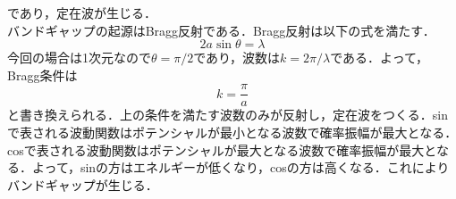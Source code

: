 \documentclass{standalone}
\begin{document}
  であり，定在波が生じる．\\
  バンドギャップの起源はBragg反射である．Bragg反射は以下の式を満たす．
  \begin{equation}
    2a\sin\theta=\lambda
  \end{equation}
  今回の場合は1次元なので$\theta=\pi/2$であり，波数は$k=2\pi/\lambda$である．よって，Bragg条件は
  \begin{equation}
    k=\frac{\pi}{a}
  \end{equation}
  と書き換えられる．上の条件を満たす波数のみが反射し，定在波をつくる．sinで表される波動関数はポテンシャルが最小となる波数で確率振幅が最大となる．
  cosで表される波動関数はポテンシャルが最大となる波数で確率振幅が最大となる．よって，sinの方はエネルギーが低くなり，cosの方は高くなる．これによりバンドギャップが生じる．
\end{document}
